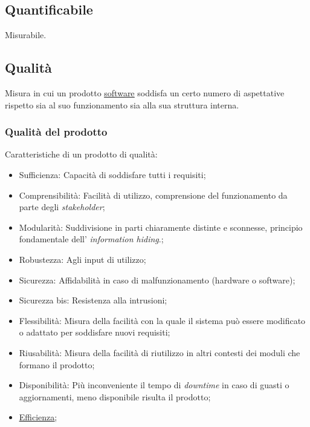 \newpage


	\subsection{Quantificabile}
	\label{sec:quantificabile}
	Misurabile.

	\subsection{Qualità}
	\label{sec:qualita}
	 Misura in cui un prodotto \underline{\hyperref[sec:prodottosoftware]{software}} soddisfa un certo numero di aspettative rispetto sia al suo funzionamento sia alla sua struttura interna.
	\subsubsection{Qualità del prodotto}
	\label{sec:qualitaprodotto}
	Caratteristiche di un prodotto di qualità:
	\begin{itemize}
	\item Sufficienza: Capacità di soddisfare tutti i requisiti;
	\item Comprensibilità: Facilità di utilizzo, comprensione del funzionamento da parte degli  \emph{stakeholder};
	\item Modularità: Suddivisione in parti chiaramente distinte e sconnesse, principio fondamentale dell' \emph{information hiding}.;
	\item Robustezza: Agli input di utilizzo;
	\item Sicurezza: Affidabilità in caso di malfunzionamento (hardware o software);
	\item Sicurezza bis: Resistenza alla intrusioni;
	\item Flessibilità: Misura della facilità con la quale il sistema può essere modificato o adattato per soddisfare nuovi requisiti;
	\item Riusabilità: Misura della facilità di riutilizzo in altri contesti dei moduli che formano il prodotto;
	\item Disponibilità: Più inconveniente il tempo di \emph{downtime} in caso di guasti o aggiornamenti, meno disponibile risulta il prodotto;
	\item \underline{\hyperref[sec:efficienza]{Efficienza}};
	\end{itemize}
